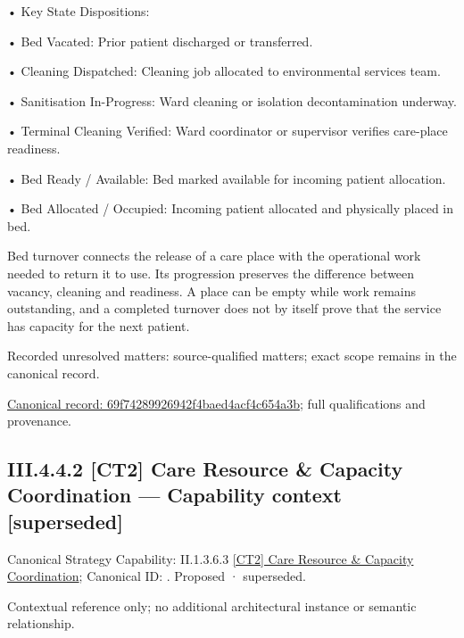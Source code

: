 •
Key State Dispositions:



•
Bed Vacated: Prior patient discharged or transferred.



•
Cleaning Dispatched: Cleaning job allocated to environmental services team.



•
Sanitisation In-Progress: Ward cleaning or isolation decontamination underway.



•
Terminal Cleaning Verified: Ward coordinator or supervisor verifies care-place readiness.



•
Bed Ready / Available: Bed marked available for incoming patient allocation.



•
Bed Allocated / Occupied: Incoming patient allocated and physically placed in bed.



Bed turnover connects the release of a care place with the operational work needed to return it to use. Its progression preserves the difference between vacancy, cleaning and readiness. A place can be empty while work remains outstanding, and a completed turnover does not by itself prove that the service has capacity for the next patient.


{\small Recorded unresolved matters: source-qualified matters; exact scope remains in the canonical record.}\par
{\footnotesize \href{../../../../../../../continuum/business/business-process/69f74289926942f4baed4acf4c654a3b.md}{Canonical record: 69f74289926942f4baed4acf4c654a3b}; full qualifications and provenance.}\par
\subsection*{III.4.4.2 [CT2] Care Resource \& Capacity Coordination — Capability context [superseded]}
\label{navigation:III.4.4.2}

{\small Canonical Strategy Capability: II.1.3.6.3 \hyperref[element:96f71cb8fa6844d7aa7e9f16759a3a62]{[CT2] Care Resource \& Capacity Coordination}; Canonical ID: \texttt{}. Proposed · superseded.}\par
Contextual reference only; no additional architectural instance or semantic relationship.\par
